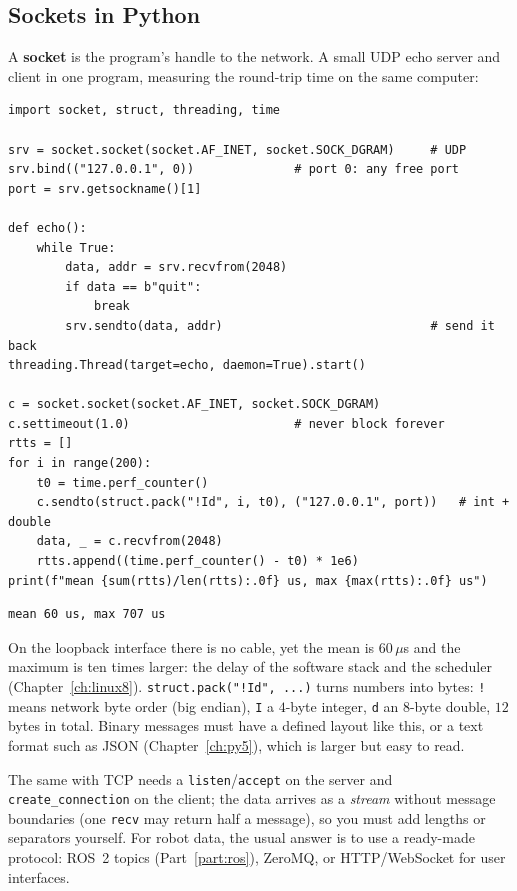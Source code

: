 \subsection*{Sockets in Python}
A \textbf{socket} is the program's handle to the network. A small UDP echo server and client in one program, measuring the round-trip time on the same computer:
\begin{verbatim}
import socket, struct, threading, time

srv = socket.socket(socket.AF_INET, socket.SOCK_DGRAM)     # UDP
srv.bind(("127.0.0.1", 0))              # port 0: any free port
port = srv.getsockname()[1]

def echo():
    while True:
        data, addr = srv.recvfrom(2048)
        if data == b"quit":
            break
        srv.sendto(data, addr)                             # send it back
threading.Thread(target=echo, daemon=True).start()

c = socket.socket(socket.AF_INET, socket.SOCK_DGRAM)
c.settimeout(1.0)                       # never block forever
rtts = []
for i in range(200):
    t0 = time.perf_counter()
    c.sendto(struct.pack("!Id", i, t0), ("127.0.0.1", port))   # int + double
    data, _ = c.recvfrom(2048)
    rtts.append((time.perf_counter() - t0) * 1e6)
print(f"mean {sum(rtts)/len(rtts):.0f} us, max {max(rtts):.0f} us")
\end{verbatim}
\begin{verbatim}
mean 60 us, max 707 us
\end{verbatim}
On the loopback interface there is no cable, yet the mean is $60\,\mu$s and the maximum is ten times larger: the delay of the software stack and the scheduler (Chapter~\ref{ch:linux8}). \texttt{struct.pack("!Id", ...)} turns numbers into bytes: \texttt{!} means network byte order (big endian), \texttt{I} a $4$-byte integer, \texttt{d} an $8$-byte double, $12$ bytes in total. Binary messages must have a defined layout like this, or a text format such as JSON (Chapter~\ref{ch:py5}), which is larger but easy to read.

The same with TCP needs a \texttt{listen}/\texttt{accept} on the server and \texttt{create\_connection} on the client; the data arrives as a \emph{stream} without message boundaries (one \texttt{recv} may return half a message), so you must add lengths or separators yourself. For robot data, the usual answer is to use a ready-made protocol: ROS~2 topics (Part~\ref{part:ros}), ZeroMQ, or HTTP/WebSocket for user interfaces.

